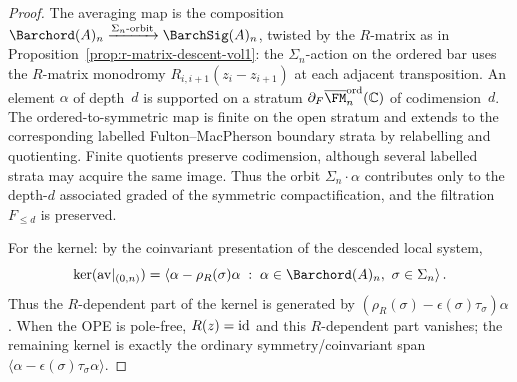 \begin{proof}
The averaging map is the composition
$\Barchord(A)_n
\xrightarrow{\Sigma_n\text{-orbit}} \BarchSig(A)_n$,
twisted by the $R$-matrix as in
Proposition~\ref{prop:r-matrix-descent-vol1}:
the $\Sigma_n$-action on the ordered bar uses the
$R$-matrix monodromy $R_{i,i+1}(z_i - z_{i+1})$ at each
adjacent transposition. An element $\alpha$ of depth~$d$
is supported on a stratum
$\partial_F\overline{\FM}_n^{\mathrm{ord}}(\mathbb{C})$
of codimension~$d$. The ordered-to-symmetric map is finite on the
open stratum and extends to the corresponding labelled
Fulton--MacPherson boundary strata by relabelling and quotienting.
Finite quotients preserve codimension, although several labelled
strata may acquire the same image. Thus the orbit
$\Sigma_n \cdot \alpha$ contributes only to the depth-$d$ associated
graded of the symmetric compactification, and the filtration
$F_{\leq d}$ is preserved.

For the kernel: by the coinvariant presentation of the descended
local system,
\[
\ker(\mathrm{av}|_{(0,n)})
=
\left\langle
\alpha-\rho_R(\sigma)\alpha
\;:\;
\alpha\in\Barchord(A)_n,\ \sigma\in\Sigma_n
\right\rangle .
\]
Thus the $R$-dependent part of the kernel is generated by
\((\rho_R(\sigma)-\epsilon(\sigma)\tau_\sigma)\alpha\).
When the OPE is pole-free, $R(z)=\mathrm{id}$ and this $R$-dependent part
vanishes; the remaining kernel is exactly the ordinary
symmetry/coinvariant span
\(\langle\alpha-\epsilon(\sigma)\tau_\sigma\alpha\rangle\).
\end{proof}

